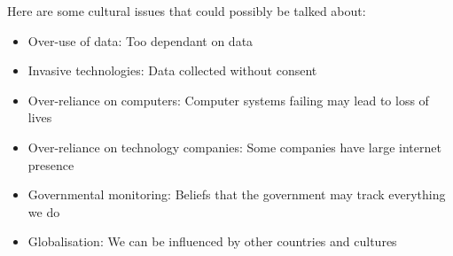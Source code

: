   Here are some cultural issues that could possibly be talked about:
  \begin{itemize}
    \setlength{\itemsep}{0em}
    \item Over-use of data: Too dependant on data
    \item Invasive technologies: Data collected without consent
    \item Over-reliance on computers: Computer systems failing may lead to loss of lives
    \item Over-reliance on technology companies: Some companies have large internet presence
    \item Governmental monitoring: Beliefs that the government may track everything we do
    \item Globalisation: We can be influenced by other countries and cultures
  \end{itemize}
